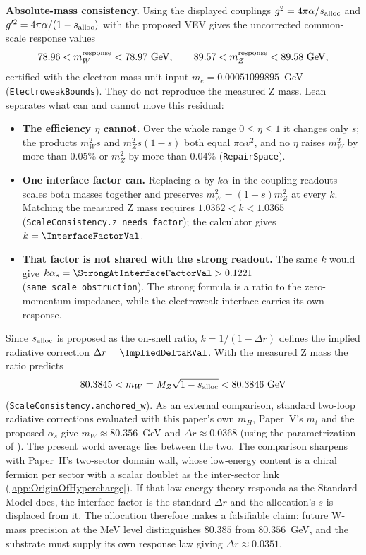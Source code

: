 
\textbf{Absolute-mass consistency.} Using the displayed couplings $g^2=4\pi\alpha/s_{\rm alloc}$ and $g'^2=4\pi\alpha/(1-s_{\rm alloc})$ with the proposed VEV gives the uncorrected common-scale response values
\begin{equation}
 78.96<m_W^{\rm response}<78.97\ {\rm GeV},\qquad
 89.57<m_Z^{\rm response}<89.58\ {\rm GeV},
\end{equation}
certified with the electron mass-unit input $m_e=0.00051099895$~GeV (\texttt{ElectroweakBounds}). They do not reproduce the measured Z mass. Lean separates what can and cannot move this residual:
\begin{itemize}
 \item \textbf{The efficiency $\eta$ cannot.} Over the whole range $0\le\eta\le1$ it changes only $s$; the products $m_W^2s$ and $m_Z^2s(1-s)$ both equal $\pi\alpha v^2$, and no $\eta$ raises $m_W^2$ by more than $0.05\%$ or $m_Z^2$ by more than $0.04\%$ (\texttt{RepairSpace}).
 \item \textbf{One interface factor can.} Replacing $\alpha$ by $k\alpha$ in the coupling readouts scales both masses together and preserves $m_W^2=(1-s)m_Z^2$ at every $k$. Matching the measured Z mass requires $1.0362<k<1.0365$ (\texttt{ScaleConsistency.z\_needs\_factor}); the calculator gives $k=\InterfaceFactorVal$.
 \item \textbf{That factor is not shared with the strong readout.} The same $k$ would give $k\alpha_s=\StrongAtInterfaceFactorVal>0.1221$ (\texttt{same\_scale\_obstruction}). The strong formula is a ratio to the zero-momentum impedance, while the electroweak interface carries its own response.
\end{itemize}
Since $s_{\rm alloc}$ is proposed as the on-shell ratio, $k=1/(1-\Delta r)$ defines the implied radiative correction $\Delta r=\ImpliedDeltaRVal$. With the measured Z mass the ratio predicts
\begin{equation}
 80.3845<m_W=M_Z\sqrt{1-s_{\rm alloc}}<80.3846\ {\rm GeV}
\end{equation}
(\texttt{ScaleConsistency.anchored\_w}). As an external comparison, standard two-loop radiative corrections evaluated with this paper's own $m_H$, Paper~V's $m_t$ and the proposed $\alpha_s$ give $m_W\approx80.356$~GeV and $\Delta r\approx0.0368$ (using the parametrization of \cite{awramik_precise_2004}). The present world average lies between the two. The comparison sharpens with Paper~II's two-sector domain wall, whose low-energy content is a chiral fermion per sector with a scalar doublet as the inter-sector link (\cref{app:OriginOfHypercharge}). If that low-energy theory responds as the Standard Model does, the interface factor is the standard $\Delta r$ and the allocation's $s$ is displaced from it. The allocation therefore makes a falsifiable claim: future W-mass precision at the MeV level distinguishes $80.385$ from $80.356$~GeV, and the substrate must supply its own response law giving $\Delta r\approx0.0351$.

